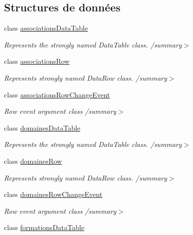\subsection*{Structures de données}
\begin{DoxyCompactItemize}
\item 
class \hyperlink{classforma_1_1formadb_data_set_1_1associations_data_table}{associations\+Data\+Table}
\begin{DoxyCompactList}\small\item\em Represents the strongly named Data\+Table class. /summary$>$ \end{DoxyCompactList}\item 
class \hyperlink{classforma_1_1formadb_data_set_1_1associations_row}{associations\+Row}
\begin{DoxyCompactList}\small\item\em Represents strongly named Data\+Row class. /summary$>$ \end{DoxyCompactList}\item 
class \hyperlink{classforma_1_1formadb_data_set_1_1associations_row_change_event}{associations\+Row\+Change\+Event}
\begin{DoxyCompactList}\small\item\em Row event argument class /summary$>$ \end{DoxyCompactList}\item 
class \hyperlink{classforma_1_1formadb_data_set_1_1domaines_data_table}{domaines\+Data\+Table}
\begin{DoxyCompactList}\small\item\em Represents the strongly named Data\+Table class. /summary$>$ \end{DoxyCompactList}\item 
class \hyperlink{classforma_1_1formadb_data_set_1_1domaines_row}{domaines\+Row}
\begin{DoxyCompactList}\small\item\em Represents strongly named Data\+Row class. /summary$>$ \end{DoxyCompactList}\item 
class \hyperlink{classforma_1_1formadb_data_set_1_1domaines_row_change_event}{domaines\+Row\+Change\+Event}
\begin{DoxyCompactList}\small\item\em Row event argument class /summary$>$ \end{DoxyCompactList}\item 
class \hyperlink{classforma_1_1formadb_data_set_1_1formations_data_table}{formations\+Data\+Table}

\end{DoxyCompactItemize}
